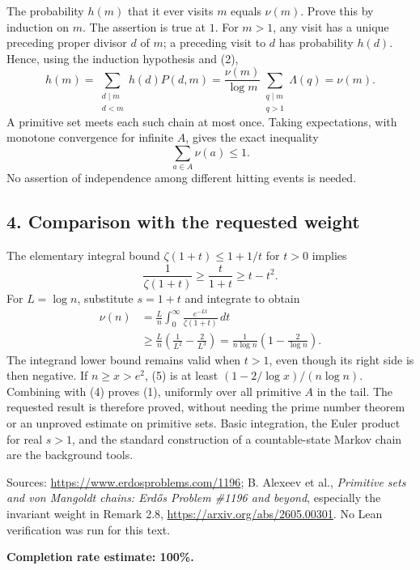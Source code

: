 The probability $h(m)$ that it ever visits $m$ equals $\nu(m)$. Prove this by induction on $m$. The assertion is true at $1$. For $m>1$, any visit has a unique preceding proper divisor $d$ of $m$; a preceding visit to $d$ has probability $h(d)$. Hence, using the induction hypothesis and (2),
\[
 h(m)=\sum_{\substack{d\mid m\\d<m}}h(d)P(d,m)
 =\frac{\nu(m)}{\log m}\sum_{\substack{q\mid m\\q>1}}\Lambda(q)=\nu(m).
\]
A primitive set meets each such chain at most once. Taking expectations, with monotone convergence for infinite $A$, gives the exact inequality
\[
 \sum_{a\in A}\nu(a)\le1. \tag{4}
\]
No assertion of independence among different hitting events is needed.

\subsection*{4. Comparison with the requested weight}
The elementary integral bound $\zeta(1+t)\le1+1/t$ for $t>0$ implies
\[
 \frac1{\zeta(1+t)}\ge\frac{t}{1+t}\ge t-t^2.
\]
For $L=\log n$, substitute $s=1+t$ and integrate to obtain
\[
 \begin{split}
 \nu(n)&=\frac{L}{n}\int_0^\infty\frac{e^{-Lt}}{\zeta(1+t)}\,dt\\
 &\ge\frac{L}{n}\left(\frac1{L^2}-\frac2{L^3}\right)
 =\frac1{n\log n}\left(1-\frac2{\log n}\right). \tag{5}
 \end{split}
\]
The integrand lower bound remains valid when $t>1$, even though its right side is then negative. If $n\ge x>e^2$, (5) is at least $(1-2/\log x)/(n\log n)$. Combining with (4) proves (1), uniformly over all primitive $A$ in the tail. The requested result is therefore proved, without needing the prime number theorem or an unproved estimate on primitive sets. Basic integration, the Euler product for real $s>1$, and the standard construction of a countable-state Markov chain are the background tools.

Sources: \url{https://www.erdosproblems.com/1196}; B. Alexeev et al., \emph{Primitive sets and von Mangoldt chains: Erd\H{o}s Problem \#1196 and beyond}, especially the invariant weight in Remark 2.8, \url{https://arxiv.org/abs/2605.00301}. No Lean verification was run for this text.

\textbf{Completion rate estimate: 100\%.}
